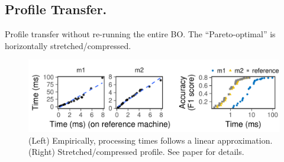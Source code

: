 \subsection{Profile Transfer.}

Profile transfer without re-running the entire BO. The ``Pareto-optimal'' is
horizontally stretched/compressed.

\begin{figure}
  \centering
  \includegraphics[width=0.95\linewidth]{figures/serving-cross-platform.pdf}
  \caption{(Left) Empirically, processing times follows a linear
    approximation. (Right) Stretched/compressed profile. See paper for
    details.}
\end{figure}

